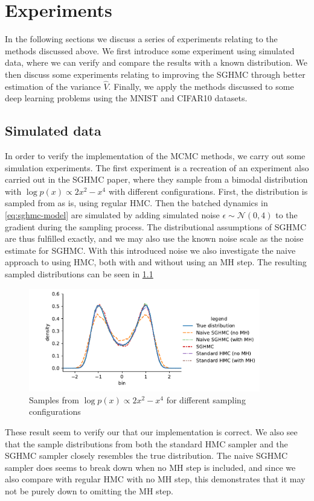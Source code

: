 \chapter{Experiments}

In the following sections we discuss a series of experiments relating to the methods discussed above. 
We first introduce some experiment using simulated data, where we can verify and compare the results with a known distribution.
We then discuss some experiments relating to improving the SGHMC through better estimation of the variance $\hat{V}$.
Finally, we apply the methods discussed to some deep learning problems using the MNIST and CIFAR10 datasets.

\section{Simulated data}

In order to verify the implementation of the MCMC methods, we carry out some simulation experiments.
The first experiment is a recreation of an experiment also carried out in the SGHMC paper, where they sample from a bimodal distribution with $\log p(x) \propto 2 x^2 - x^ 4$ with different configurations. 
First, the distribution is sampled from as is, using regular HMC.
Then the batched dynamics in \cref{eq:sghmc-model} are simulated by adding simulated noise $\epsilon \sim \mathcal{N}(0, 4)$ to the gradient during the sampling process. 
The distributional assumptions of SGHMC are thus fulfilled exactly, and we may also use the known noise scale as the noise estimate for SGHMC. 
With this introduced noise we also investigate the naive approach to using HMC, both with and without using an MH step. 
The resulting sampled distributions can be seen in \cref{fig:synthetic}
\begin{figure}[htb]
    \centering
    \includegraphics[width=0.9\textwidth]{Figures/synthetic.pdf}
    \caption{Samples from $\log p(x) \propto 2 x^2 - x^ 4$ for different sampling configurations}
    \label{fig:synthetic}
\end{figure}
These result seem to verify our that our implementation is correct.
We also see that the sample distributions from both the standard HMC sampler and the SGHMC sampler closely resembles the true distribution. 
The naive SGHMC sampler does seems to break down when no MH step is included, and since we also compare with regular HMC with no MH step, this demonstrates that it may not be purely down to omitting the MH step. 

